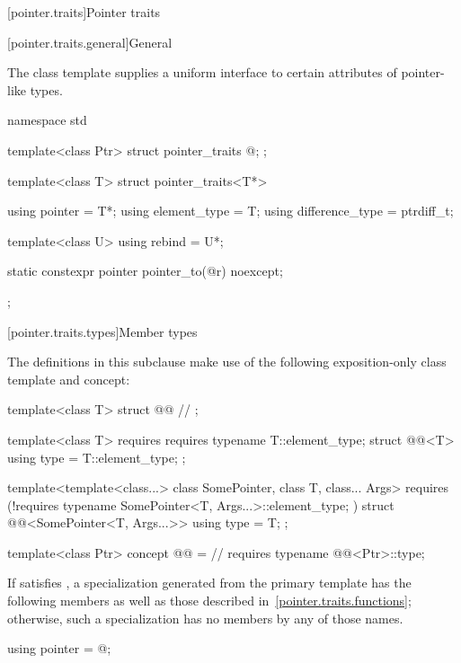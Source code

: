 [pointer.traits]{Pointer traits}

[pointer.traits.general]{General}

\pnum
The class template  supplies a uniform interface to certain
attributes of pointer-like types.

%
\begin{codeblock}
namespace std {
  template<class Ptr> struct pointer_traits {
    @\seebelow@;
  };

  template<class T> struct pointer_traits<T*> {
    using pointer         = T*;
    using element_type    = T;
    using difference_type = ptrdiff_t;

    template<class U> using rebind = U*;

    static constexpr pointer pointer_to(@\seebelow@ r) noexcept;
  };
}
\end{codeblock}

[pointer.traits.types]{Member types}

\pnum
The definitions in this subclause make use of
the following exposition-only class template and concept:
\begin{codeblock}
template<class T>
struct @@          // \expos
{ };

template<class T> requires requires { typename T::element_type; }
struct @@<T>
{ using type = T::element_type; };

template<template<class...> class SomePointer, class T, class... Args>
  requires (!requires { typename SomePointer<T, Args...>::element_type; })
struct @@<SomePointer<T, Args...>>
{ using type = T; };

template<class Ptr>
  concept @@ =       // \expos
    requires { typename @@<Ptr>::type; }
\end{codeblock}

\pnum
If  satisfies ,
a specialization 
generated from the  primary template
has the following members
as well as those described in~\ref{pointer.traits.functions};
otherwise, such a specialization has no members by any of those names.

%
\begin{itemdecl}
using pointer = @\seebelow@;
\end{itemdecl}


